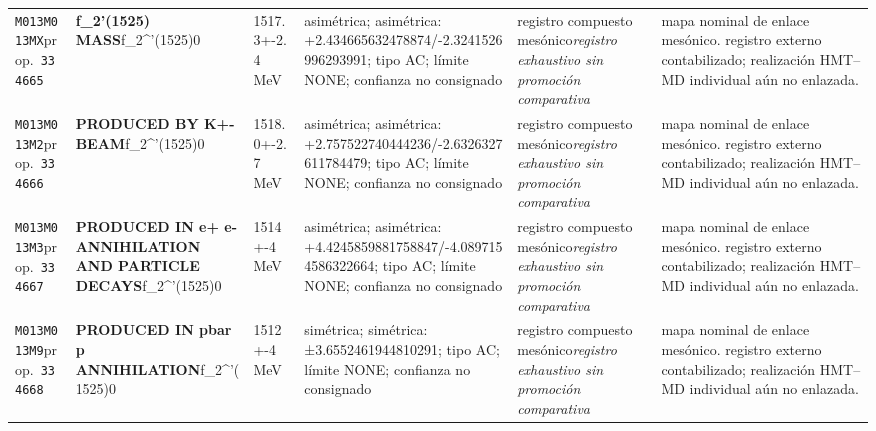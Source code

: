 \begin{landscape}
\begin{longtable}{L{1.85cm}L{4.45cm}L{2.35cm}L{4.05cm}L{3.35cm}L{7.15cm}}
\texttt{M013}\newline \texttt{M013MX}\newline prop.\ \texttt{334665} & \textbf{f\_\allowbreak{}2'(1525) MASS}\newline f\_\allowbreak{}2\textasciicircum{}'(1525)0 & 1517.3+-2.4\,MeV & asimétrica; asimétrica: +2.434665632478874/-2.3241526996293991; tipo AC; límite NONE; confianza no consignado & registro compuesto mesónico\newline \emph{registro exhaustivo sin promoción comparativa} & mapa nominal de enlace mesónico. registro externo contabilizado; realización HMT--MD individual aún no enlazada. \\
\texttt{M013}\newline \texttt{M013M2}\newline prop.\ \texttt{334666} & \textbf{PRODUCED BY K+- BEAM}\newline f\_\allowbreak{}2\textasciicircum{}'(1525)0 & 1518.0+-2.7\,MeV & asimétrica; asimétrica: +2.757522740444236/-2.6326327611784479; tipo AC; límite NONE; confianza no consignado & registro compuesto mesónico\newline \emph{registro exhaustivo sin promoción comparativa} & mapa nominal de enlace mesónico. registro externo contabilizado; realización HMT--MD individual aún no enlazada. \\
\texttt{M013}\newline \texttt{M013M3}\newline prop.\ \texttt{334667} & \textbf{PRODUCED IN e+ e- ANNIHILATION AND PARTICLE DECAYS}\newline f\_\allowbreak{}2\textasciicircum{}'(1525)0 & 1514+-4\,MeV & asimétrica; asimétrica: +4.4245859881758847/-4.0897154586322664; tipo AC; límite NONE; confianza no consignado & registro compuesto mesónico\newline \emph{registro exhaustivo sin promoción comparativa} & mapa nominal de enlace mesónico. registro externo contabilizado; realización HMT--MD individual aún no enlazada. \\
\texttt{M013}\newline \texttt{M013M9}\newline prop.\ \texttt{334668} & \textbf{PRODUCED IN pbar p ANNIHILATION}\newline f\_\allowbreak{}2\textasciicircum{}'(1525)0 & 1512+-4\,MeV & simétrica; simétrica: ±3.6552461944810291; tipo AC; límite NONE; confianza no consignado & registro compuesto mesónico\newline \emph{registro exhaustivo sin promoción comparativa} & mapa nominal de enlace mesónico. registro externo contabilizado; realización HMT--MD individual aún no enlazada. \\

\end{longtable}
\end{landscape}
